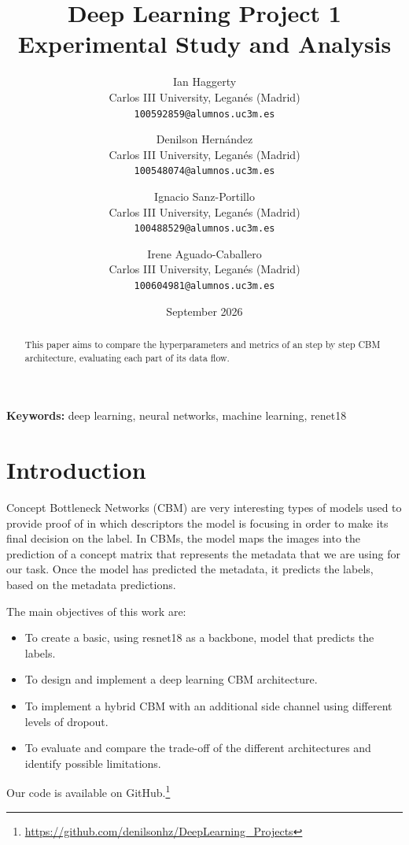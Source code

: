 \documentclass[11pt,a4paper,twocolumn]{article}
\title{
    \vspace{-1cm}
    \textbf{Deep Learning Project 1}\\
    \large Experimental Study and Analysis
}
\author{
    Ian Haggerty\\
    Carlos III University, Leganés (Madrid)\\
    \texttt{100592859@alumnos.uc3m.es}
    \and
    Denilson Hernández\\
    Carlos III University, Leganés (Madrid)\\
    \texttt{100548074@alumnos.uc3m.es}
    \and
    Ignacio Sanz-Portillo\\
    Carlos III University, Leganés (Madrid)\\
    \texttt{100488529@alumnos.uc3m.es}
    \and
    Irene Aguado-Caballero\\
    Carlos III University, Leganés (Madrid)\\
    \texttt{100604981@alumnos.uc3m.es}
}
\date{September 2026}
\begin{document}
\maketitle

\begin{abstract}

This paper aims to compare the hyperparameters and metrics of an step by step 
CBM architecture, evaluating each part of its data flow. 


\end{abstract}

\vspace{0.3cm}

\noindent
\textbf{Keywords:}
deep learning, neural networks, machine learning, renet18



\section{Introduction}

Concept Bottleneck Networks (CBM) are very interesting types of models 
used to provide proof of in which descriptors the model is focusing in order to make its final decision on the label. In CBMs, the model maps the images
into the prediction of a concept matrix that represents the metadata that 
we are using for our task. Once the model has predicted the metadata, it predicts the labels, based on the metadata predictions.

The main objectives of this work are:
\begin{itemize}
    \item To create a basic, using resnet18 as a backbone, model that predicts the labels.
    \item To design and implement a deep learning CBM
    architecture.
    \item To implement a hybrid CBM with an additional side channel using different levels of dropout.
    \item To evaluate and compare the trade-off of the different architectures and identify possible limitations.
\end{itemize}

Our code is available on GitHub.\footnote{\url{https://github.com/denilsonhz/DeepLearning_Projects}}
\end{document}
